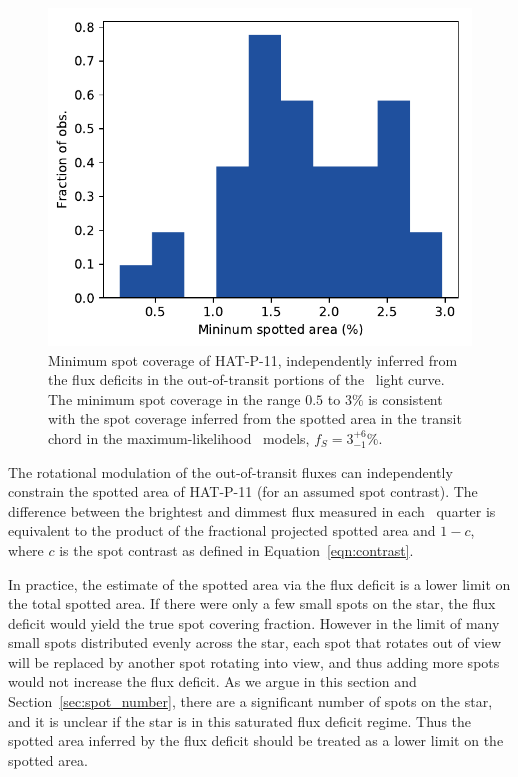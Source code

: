 \begin{figure}
\centering
\includegraphics[scale=0.65]{stsp_hat_p_11/flux_deficit.pdf}
\caption{Minimum spot coverage of HAT-P-11, independently inferred from the flux deficits in the out-of-transit portions of the \kepler\ light curve. The minimum spot coverage in the range $0.5$ to $3\%$ is consistent with the spot coverage inferred from the spotted area in the transit chord in the maximum-likelihood \stsp\ models, $f_S = 3^{+6}_{-1} \% $.}
\label{fig:flux_deficit}
\end{figure}

The rotational modulation of the out-of-transit fluxes can independently constrain the spotted area of HAT-P-11 (for an assumed spot contrast). The difference between the brightest and dimmest flux measured in each \kepler\ quarter is equivalent to the product of the fractional projected spotted area and $1-c$, where $c$ is the spot contrast as defined in Equation~\ref{eqn:contrast}. 

In practice, the estimate of the spotted area via the flux deficit is a lower limit on the total spotted area. If there were only a few small spots on the star, the flux deficit would yield the true spot covering fraction. However in the limit of many small spots distributed evenly across the star, each spot that rotates out of view will be replaced by another spot rotating into view, and thus adding more spots would not increase the flux deficit. As we argue in this section and Section~\ref{sec:spot_number}, there are a significant number of spots on the star, and it is unclear if the star is in this saturated flux deficit regime. Thus the spotted area inferred by the flux deficit should be treated as a lower limit on the spotted area.

